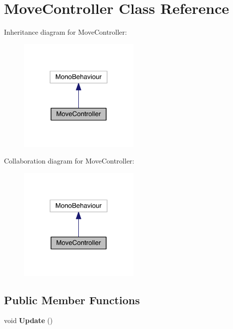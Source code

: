 \hypertarget{class_move_controller}{}\section{Move\+Controller Class Reference}
\label{class_move_controller}


Inheritance diagram for Move\+Controller\+:\nopagebreak
\begin{figure}[H]
\begin{center}
\leavevmode
\includegraphics[width=166pt]{class_move_controller__inherit__graph}
\end{center}
\end{figure}


Collaboration diagram for Move\+Controller\+:\nopagebreak
\begin{figure}[H]
\begin{center}
\leavevmode
\includegraphics[width=166pt]{class_move_controller__coll__graph}
\end{center}
\end{figure}
\subsection*{Public Member Functions}
\begin{DoxyCompactItemize}
\item 
void {\bfseries Update} ()\hypertarget{class_move_controller_a2294f955042249ea019511f40aa1d47b}{}\label{class_move_controller_a2294f955042249ea019511f40aa1d47b}

\end{DoxyCompactItemize}

